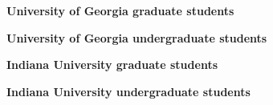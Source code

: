 \documentclass[11pt, a4paper]{awesome-cv}
\begin{document}
\textbf{University of Georgia graduate students}

\begin{cvhonors}
\end{cvhonors}

\textbf{University of Georgia undergraduate students}

\begin{cvhonors}
\end{cvhonors}

\textbf{Indiana University graduate students}

\begin{cvhonors}
\end{cvhonors}

\textbf{Indiana University undergraduate students}

\begin{cvhonors}
\end{cvhonors}
\end{document}
